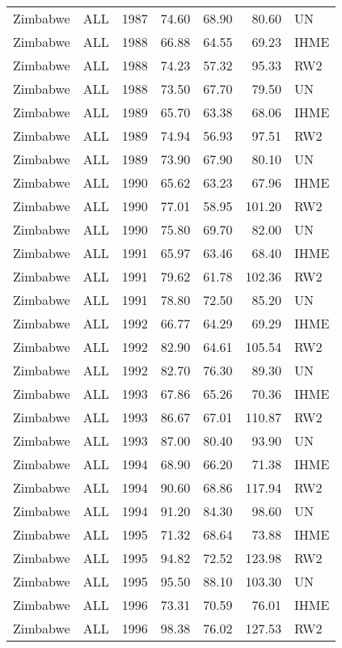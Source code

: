 \begin{longtable}{lllrrrl}
  Zimbabwe & ALL & 1987 & 74.60 & 68.90 & 80.60 & UN \\ 
  Zimbabwe & ALL & 1988 & 66.88 & 64.55 & 69.23 & IHME \\ 
  Zimbabwe & ALL & 1988 & 74.23 & 57.32 & 95.33 & RW2 \\ 
  Zimbabwe & ALL & 1988 & 73.50 & 67.70 & 79.50 & UN \\ 
  Zimbabwe & ALL & 1989 & 65.70 & 63.38 & 68.06 & IHME \\ 
  Zimbabwe & ALL & 1989 & 74.94 & 56.93 & 97.51 & RW2 \\ 
  Zimbabwe & ALL & 1989 & 73.90 & 67.90 & 80.10 & UN \\ 
  Zimbabwe & ALL & 1990 & 65.62 & 63.23 & 67.96 & IHME \\ 
  Zimbabwe & ALL & 1990 & 77.01 & 58.95 & 101.20 & RW2 \\ 
  Zimbabwe & ALL & 1990 & 75.80 & 69.70 & 82.00 & UN \\ 
  Zimbabwe & ALL & 1991 & 65.97 & 63.46 & 68.40 & IHME \\ 
  Zimbabwe & ALL & 1991 & 79.62 & 61.78 & 102.36 & RW2 \\ 
  Zimbabwe & ALL & 1991 & 78.80 & 72.50 & 85.20 & UN \\ 
  Zimbabwe & ALL & 1992 & 66.77 & 64.29 & 69.29 & IHME \\ 
  Zimbabwe & ALL & 1992 & 82.90 & 64.61 & 105.54 & RW2 \\ 
  Zimbabwe & ALL & 1992 & 82.70 & 76.30 & 89.30 & UN \\ 
  Zimbabwe & ALL & 1993 & 67.86 & 65.26 & 70.36 & IHME \\ 
  Zimbabwe & ALL & 1993 & 86.67 & 67.01 & 110.87 & RW2 \\ 
  Zimbabwe & ALL & 1993 & 87.00 & 80.40 & 93.90 & UN \\ 
  Zimbabwe & ALL & 1994 & 68.90 & 66.20 & 71.38 & IHME \\ 
  Zimbabwe & ALL & 1994 & 90.60 & 68.86 & 117.94 & RW2 \\ 
  Zimbabwe & ALL & 1994 & 91.20 & 84.30 & 98.60 & UN \\ 
  Zimbabwe & ALL & 1995 & 71.32 & 68.64 & 73.88 & IHME \\ 
  Zimbabwe & ALL & 1995 & 94.82 & 72.52 & 123.98 & RW2 \\ 
  Zimbabwe & ALL & 1995 & 95.50 & 88.10 & 103.30 & UN \\ 
  Zimbabwe & ALL & 1996 & 73.31 & 70.59 & 76.01 & IHME \\ 
  Zimbabwe & ALL & 1996 & 98.38 & 76.02 & 127.53 & RW2 \\ 

\end{longtable}
